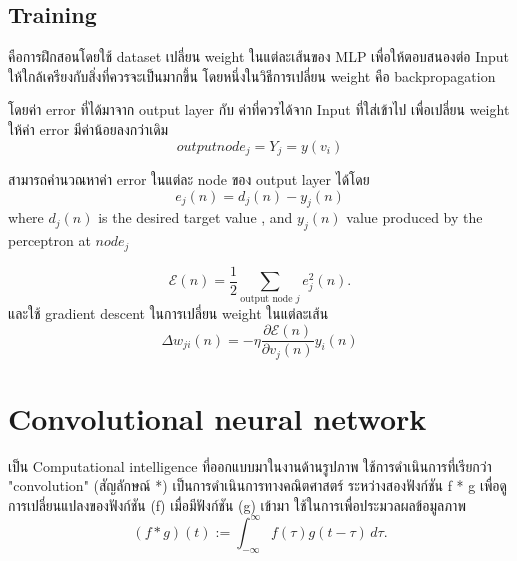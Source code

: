 \subsection{Training}
คือการฝึกสอนโดยใช้ dataset เปลี่ยน weight ในแต่ละเส้นของ MLP เพื่อให้ตอบสนองต่อ Input ให้ใกล้เครียงกับสิ่งที่ควรจะเป็นมากขึ้น
โดยหนึ่งในวิธีการเปลี่ยน weight คือ backpropagation


โดยค่า error ที่ได้มาจาก output layer กับ ค่าที่ควรได้จาก Input ที่ใส่เข้าไป เพื่อเปลี่ยน weight ให้ค่า error มีค่าน้อยลงกว่าเดิม
\begin{equation} output node_j =  Y_j =  y(v_i)  \end{equation}

สามารถคำนวณหาค่า error ในแต่ละ node ของ output layer ได้โดย
\begin{equation}  e_j(n)=d_j(n)-y_j(n)
\end{equation}
where $d_{j}(n)$  is the desired target value , and $y_{j}(n)$   value produced by the perceptron at $node_j$



\begin{equation}
  {\displaystyle {\mathcal {E}}(n)={\frac {1}{2}}\sum _{{\text{output node }}j}e_{j}^{2}(n)}.
\end{equation}
และใช้  gradient descent ในการเปลี่ยน weight ในแต่ละเส้น
\begin{equation}
  \Delta w_{ji} (n) = -\eta\frac{\partial\mathcal{E}(n)}{\partial v_j(n)} y_i(n)
\end{equation}




\section{Convolutional neural network}
เป็น Computational intelligence ที่ออกแบบมาในงานด้านรูปภาพ
ใช้การดำเนินการที่เรียกว่า "convolution"  (สัญลักษณ์ *) เป็นการดำเนินการทางคณิตศาสตร์ ระหว่างสองฟังก์ชัน f * g เพื่อดูการเปลี่ยนแปลงของฟังก์ชัน (f) เมื่อมีฟังก์ชัน (g) เข้ามา
ใช้ในการเพื่อประมวลผลข้อมูลภาพ
\begin{equation}
  {\displaystyle (f*g)(t):=\int _{-\infty }^{\infty }f(\tau )g(t-\tau )\,d\tau .}
\end{equation}

